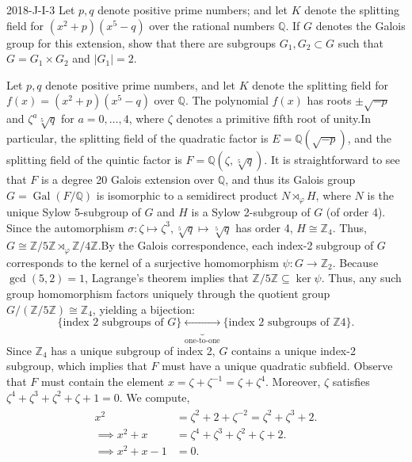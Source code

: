 \documentclass{article}
\begin{document}
	\begin{prb}{2018-J-I-3}
		Let $p,q$ denote positive prime numbers; and let $K$ denote the splitting field for $(x^{2} + p)(x^{5} -q)$ over the rational numbers $\mathbb{Q}$. If $G$ denotes the Galois group for this extension, show that there are subgroups $G_1, G_2 \subset G$ such that $G = G_1 \times G_2$ and $|G_{1}| = 2$. 
	\end{prb}
	Let $p, q$ denote positive prime numbers, and let $K$ denote the splitting field for $f(x) = (x^2 + p)(x^{5} - q)$ over $\mathbb{Q}$. The polynomial $f(x)$ has roots $\pm \sqrt{-p}$ and $\zeta^{a}\sqrt[5]{q}$ for $a = 0, \ldots, 4$, where $\zeta$ denotes a primitive fifth root of unity.In particular, the splitting field of the quadratic factor is $E = \mathbb{Q}(\sqrt{-p})$, and the splitting field of the quintic factor is $F = \mathbb{Q}(\zeta, \sqrt[5]{q})$. It is straightforward to see that $F$ is a degree 20 Galois extension over $\mathbb{Q}$, and thus its Galois group $G = \operatorname{Gal}(F/\mathbb{Q})$ is isomorphic to a semidirect product $N \rtimes_{\varphi} H$, where $N$ is the unique Sylow 5-subgroup of $G$ and $H$ is a Sylow 2-subgroup of $G$ (of order 4). Since the automorphism $\sigma: \zeta \mapsto \zeta^{3}, \sqrt[5]{q} \mapsto \sqrt[5]{q}$ has order 4, $H \cong \mathbb{Z}_{4}$. Thus, $G \cong \mathbb{Z}/5\mathbb{Z}\rtimes_{\varphi}\mathbb{Z}/4\mathbb{Z}$.By the Galois correspondence, each index-2 subgroup of $G$ corresponds to the kernel of a surjective homomorphism $\psi: G \to \mathbb{Z}_{2}$. Because $\gcd(5, 2) = 1$, Lagrange's theorem implies that $\mathbb{Z}/5\mathbb{Z} \subseteq \ker{\psi}$. Thus, any such group homomorphism factors uniquely through the quotient group $G / (\mathbb{Z}/5\mathbb{Z}) \cong \mathbb{Z}_4$, yielding a bijection:
	\begin{equation*}
		\{\text{index 2 subgroups of } G\} \underbrace{\longleftrightarrow}_{\text{one-to-one}} \{\text{index 2 subgroups of } \mathbb{Z}{4}\}.
	\end{equation*}
	Since $\mathbb{Z}_4$ has a unique subgroup of index 2, $G$ contains a unique index-2 subgroup, which implies that $F$ must have a unique quadratic subfield. Observe that $F$ must contain the element $x = \zeta + \zeta^{-1} = \zeta + \zeta^{4}$. Moreover, $\zeta$ satisfies $\zeta^{4} + \zeta^{3} + \zeta^{2} + \zeta + 1 = 0$. We compute, 
	\begin{align*}
		\begin{split}
			x^{2} &= \zeta^{2} + 2 + \zeta^{-2} = \zeta^{2} + \zeta^{3} + 2. \\
			\implies 
			x^{2} + x &= \zeta^{4} + \zeta^{3} + \zeta^{2} + \zeta + 2. \\
			\implies 
			x^{2} + x -1 &= 0. 
		\end{split}
	\end{align*}
\end{document}

